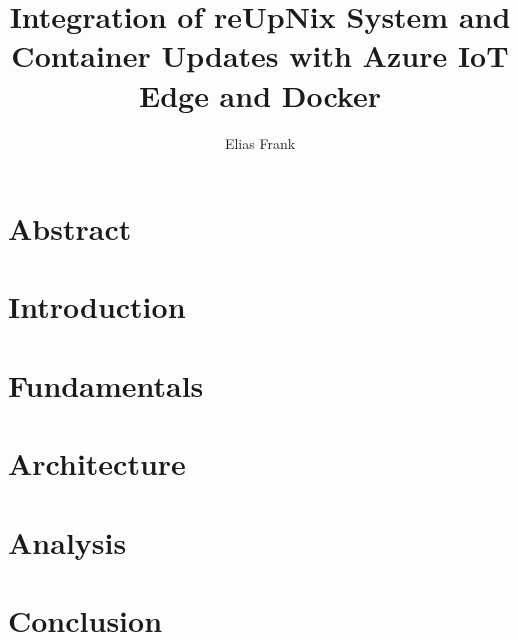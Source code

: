 \documentclass[twoside]{textmf-local/srathesis}
\author{Elias Frank}
\title{Integration of reUpNix System and Container Updates with Azure IoT Edge and Docker}
\begin{document}
\pagestyle{fancy}

\maketitle

\chapter*{Abstract}

\acresetall

\cleardoublepage
\tableofcontents

\cleardoublepage
{}


\chapter{Introduction}


\chapter{Fundamentals}


\chapter{Architecture}

\chapter{Analysis}

\chapter{Conclusion}


\cleardoublepage

\pagestyle{fancy-lists}


%
\chaptermark{\listoftitlename}

%
\sectionmark{\glossarytitlename}
\chapter*{\glossarytitlename}

\cleardoublepage
\end{document}
